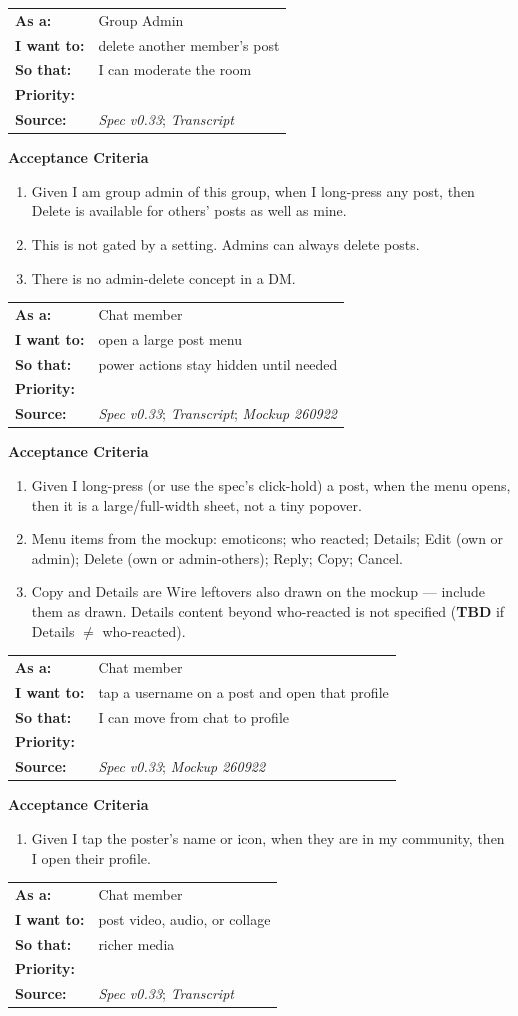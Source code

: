 \documentclass[11pt,a4paper]{article}
\makeatletter
\newcommand{\priPzero}{\colorbox{p0}{\makebox[4.6em]{\textcolor{white}{\scriptsize\bfseries P0 V1}}}}
\newcommand{\priPtwo}{\colorbox{p2}{\makebox[4.6em]{\textcolor{white}{\scriptsize\bfseries P2 Later}}}}
\newcommand{\srcSpec}{\textit{Spec v0.33}}
\newcommand{\srcTx}{\textit{Transcript}}
\newcommand{\srcMock}{\textit{Mockup 260922}}
\newenvironment{story}[1]{%
  \Needspace{10\baselineskip}%
  \vspace{0.7em}%
  \noindent
  \colorbox{navy}{\makebox[\dimexpr\textwidth-2\fboxsep\relax][l]{\textcolor{white}{\bfseries\ #1}}}%
  \par\vspace{0.35em}%
}{\par\vspace{0.55em}}
\newcommand{\storymeta}[5]{%
  \noindent
  \begin{tabularx}{\textwidth}{@{}>{\bfseries}l X@{}}
    As a: & #1 \\
    I want to: & #2 \\
    So that: & #3 \\
    Priority: & #4 \\
    Source: & #5 \\
  \end{tabularx}
  \par\vspace{0.3em}
}
\newcommand{\achead}{\noindent\textbf{Acceptance Criteria}\par}
\makeatother
\begin{document}
\begin{story}{POST-009 --- Group admin deletes any post}
\storymeta{Group Admin}{delete another member's post}{I can moderate the room}{\priPzero}{\srcSpec; \srcTx}
\achead
\begin{enumerate}
  \item Given I am group admin of this group, when I long-press any post, then Delete is available for others' posts as well as mine.
  \item This is not gated by a setting. Admins can always delete posts.
  \item There is no admin-delete concept in a DM.
\end{enumerate}
\end{story}

\begin{story}{POST-010 --- Long-press / post menu (B3)}
\storymeta{Chat member}{open a large post menu}{power actions stay hidden until needed}{\priPzero}{\srcSpec; \srcTx; \srcMock}
\achead
\begin{enumerate}
  \item Given I long-press (or use the spec's click-hold) a post, when the menu opens, then it is a large/full-width sheet, not a tiny popover.
  \item Menu items from the mockup: emoticons; who reacted; Details; Edit (own or admin); Delete (own or admin-others); Reply; Copy; Cancel.
  \item Copy and Details are Wire leftovers also drawn on the mockup --- include them as drawn. Details content beyond who-reacted is not specified (\textbf{TBD} if Details $\neq$ who-reacted).
\end{enumerate}
\end{story}

\begin{story}{POST-011 --- Open poster profile from username}
\storymeta{Chat member}{tap a username on a post and open that profile}{I can move from chat to profile}{\priPzero}{\srcSpec; \srcMock}
\achead
\begin{enumerate}
  \item Given I tap the poster's name or icon, when they are in my community, then I open their profile.
\end{enumerate}
\end{story}

\begin{story}{POST-012 --- Video, audio, collage later}
\storymeta{Chat member}{post video, audio, or collage}{richer media}{\priPtwo}{\srcSpec; \srcTx}
\end{story}
\end{document}
